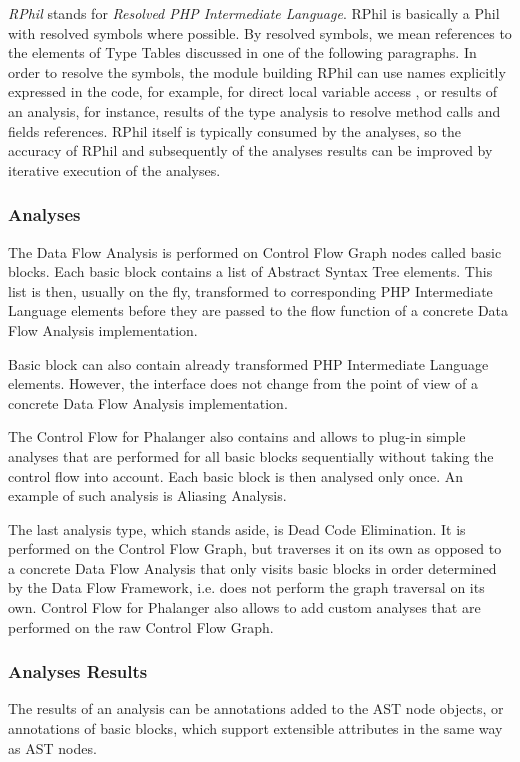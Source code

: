     \emph{RPhil} stands for \emph{Resolved PHP Intermediate Language}. 
    RPhil is basically a Phil with resolved symbols where possible. 
    By resolved symbols, we mean references to the elements 
    of Type Tables discussed in one of the following paragraphs. 
    In order to resolve the symbols, the module building RPhil 
    can use names explicitly expressed in the code, for example, 
    for direct local variable access , or results of 
    an analysis, for instance, results of the type analysis to 
    resolve method calls and fields references. 
    RPhil itself is typically consumed by the analyses, 
    so the accuracy of RPhil and subsequently of the 
    analyses results can be improved by iterative execution 
    of the analyses.
    
    \subsubsection*{Analyses}
    The Data Flow Analysis is performed on Control Flow Graph 
    nodes called basic blocks. Each basic block contains 
    a list of Abstract Syntax Tree elements. This list is 
    then, usually on the fly, transformed to corresponding PHP 
    Intermediate Language elements before they are passed 
    to the flow function of a concrete Data Flow Analysis 
    implementation. 
    
    Basic block can also contain already transformed PHP 
    Intermediate Language elements. However, the interface 
    does not change from the point of view of a concrete 
    Data Flow Analysis implementation.
    
    The Control Flow for Phalanger also contains and allows to 
    plug-in simple analyses that are performed for all 
    basic blocks sequentially without taking the control 
    flow into account. Each basic block is then analysed 
    only once. An example of such analysis is Aliasing Analysis.
    
    The last analysis type, which stands aside, is Dead Code 
    Elimination. It is performed on the Control Flow Graph, 
    but traverses it on its own as opposed to a concrete 
    Data Flow Analysis that only visits basic blocks 
    in order determined by the Data Flow Framework, 
    i.e. does not perform the graph traversal 
    on its own. Control Flow for Phalanger also allows 
    to add custom analyses that are performed on the raw 
    Control Flow Graph.
    
    \subsubsection*{Analyses Results}
    The results of an analysis can be annotations added 
    to the AST node objects, or annotations of basic blocks, 
    which support extensible attributes in the same way as 
    AST nodes.
    
